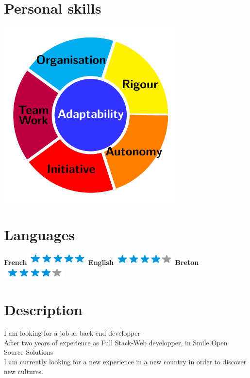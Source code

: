 \documentclass{friggeri-cv}
\begin{document}
\begin{aside}
	\section{Personal skills}
	\includegraphics[scale=0.70]{test.pdf}
	~
	\section{Languages}
	\textbf{French}\includegraphics[scale=0.40]{img/5stars.png}
	\textbf{English}\includegraphics[scale=0.40]{img/4stars.png}
	\textbf{Breton}\includegraphics[scale=0.40]{img/4stars.png}
\end{aside}
\section{Description}
\begin{entrylist}
	I am looking for a job as back end developper \\
	After two years of experience as Full Stack-Web developper, in Smile Open Source Solutions \\
	I am currently looking for a new experience in a new country in order to discover new cultures. \\
\end{entrylist}
   
\end{document}

